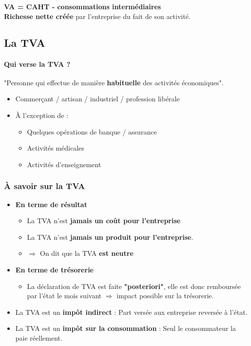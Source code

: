 \textbf{VA = CAHT - consommations intermédiaires}\\

\textbf{Richesse nette créée} par l'entreprise du fait de son activité.


\subsection{La TVA}
\paragraph{Qui verse la TVA ?} "Personne qui effectue de manière \textbf{habituelle} des activités économiques".

\begin{itemize}
	\item Commerçant / artisan / industriel / profession libérale
	\item \`A l'exception de :
		\begin{itemize}
			\item Quelques opérations de banque / assurance
			\item Activités médicales
			\item Activités d'enseignement
		\end{itemize}
\end{itemize}

\subsubsection{\`A savoir sur la TVA}
\begin{itemize}
	\item \textbf{En terme de résultat}
	\begin{itemize}
		\item La TVA n'est \textbf{jamais un co\^ut pour l'entreprise}
		\item La TVA n'est \textbf{jamais un produit pour l'entreprise}.
		\item $\Rightarrow$ On dit que la TVA \textbf{est neutre}\\
	\end{itemize}
	
	
	\item \textbf{En terme de trésorerie}
	\begin{itemize}
		\item La déclaration de TVA est faite \textbf{"posteriori"}, elle est donc remboursée par l'état le mois suivant $\Longrightarrow$ impact possible sur la trésorerie.\\
	\end{itemize}
	
	\item La TVA est un \textbf{imp\^ot indirect} : Part versée aux entreprise reversée à l'état.
	\item La TVA est un \textbf{impôt sur la consommation} : Seul le consommateur la paie réellement.
\end{itemize}

